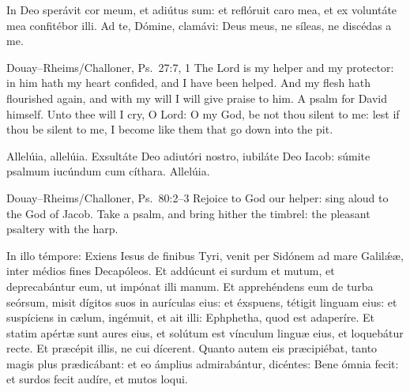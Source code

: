 In Deo sperávit cor meum, et adiútus sum: et reflóruit caro mea, et ex
voluntáte mea confitébor illi.  Ad te, Dómine, clamávi: Deus meus,
ne síleas, ne discédas a me.
\finishfulltextelement
\begin{fulltextenglish}{Douay--Rheims/Challoner, Ps.~27:7, 1}
The Lord is my helper and my protector: in him hath my heart confided, and I
have been helped. And my flesh hath flourished again, and with my will I will
give praise to him. A psalm for David himself. Unto thee will I cry, O Lord:
O my God, be not thou silent to me: lest if thou be silent to me, I become
like them that go down into the pit.
\end{fulltextenglish}

Allelúia, allelúia.  Exsultáte Deo adiutóri nostro, iubiláte Deo
Iacob: súmite psalmum iucúndum cum cíthara. Allelúia.
\finishfulltextelement
\begin{fulltextenglish}{Douay--Rheims/Challoner, Ps.~80:2--3}
Rejoice to God our helper: sing aloud to the God of Jacob. Take a psalm, and
bring hither the timbrel: the pleasant psaltery with the harp.
\end{fulltextenglish}

In illo témpore: Exiens Iesus de finibus Tyri, venit per Sidónem ad mare
Galilǽæ, inter médios fines Decapóleos. Et addúcunt ei surdum et mutum, et
deprecabántur eum, ut impónat illi manum. Et apprehéndens eum de turba
seórsum, misit dígitos suos in aurículas eius: et éxspuens, tétigit linguam
eius: et suspíciens in cælum, ingémuit, et ait illi: Ephphetha, quod est
adaperíre. Et statim apértæ sunt aures eius, et solútum est vínculum linguæ
eius, et loquebátur recte. Et præcépit illis, ne cui dícerent. Quanto autem
eis præcipiébat, tanto magis plus prædicábant: et eo ámplius admirabántur,
dicéntes: Bene ómnia fecit: et surdos fecit audíre, et mutos loqui.

